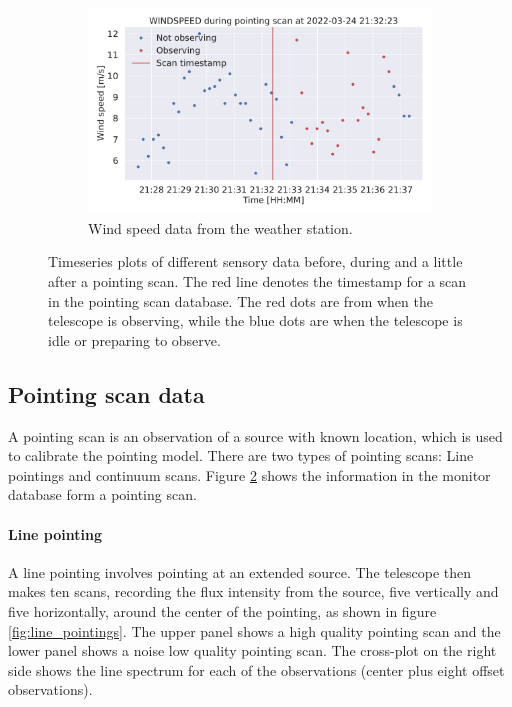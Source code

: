 \begin{figure}[H]
\begin{subfigure}[t]{0.49\textwidth}
        \centering
        \includegraphics[width=\textwidth]{Feature during scans/scan_WINDSPEED_335.pdf}
        \caption{Wind speed data from the weather station.}
        \label{subfig:scan_windspeed}
    \end{subfigure}
     \caption{Timeseries plots of different sensory data before, during and a little after a pointing scan. The red line denotes the timestamp for a scan in the pointing scan database.
     The red dots are from when the telescope is observing, while the blue dots are when the telescope is idle or preparing to observe.}
     \label{fig:features_during_scans}
\end{figure}


\subsection{Pointing scan data}
A pointing scan is an observation of a source with known location, which is used to calibrate the pointing model.
There are two types of pointing scans: Line pointings and continuum scans.
Figure \ref{fig:features_during_scans} shows the information in the monitor database form a pointing scan.
\paragraph{Line pointing}
A line pointing involves pointing at an extended source. 
The telescope then makes ten scans, recording the flux intensity from the source, five vertically and five horizontally, around the center of the pointing, as shown in figure \ref{fig:line_pointings}.
The upper panel shows a high quality pointing scan and the lower panel shows a noise low quality pointing scan.
The cross-plot on the right side shows the line spectrum for each of the observations (center plus eight offset observations).

